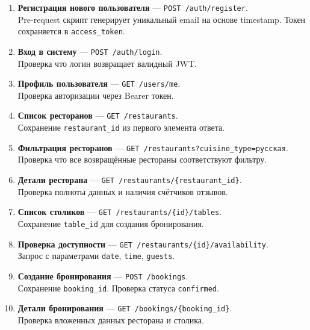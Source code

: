 \documentclass[a4paper,14pt]{extarticle}
\begin{document}
\begin{enumerate}[leftmargin=2cm]
  \item \textbf{Регистрация нового пользователя} — \texttt{POST /auth/register}.\\
    Pre-request скрипт генерирует уникальный email на основе timestamp.
    Токен сохраняется в \texttt{access\_token}.

  \item \textbf{Вход в систему} — \texttt{POST /auth/login}.\\
    Проверка что логин возвращает валидный JWT.

  \item \textbf{Профиль пользователя} — \texttt{GET /users/me}.\\
    Проверка авторизации через Bearer токен.

  \item \textbf{Список ресторанов} — \texttt{GET /restaurants}.\\
    Сохранение \texttt{restaurant\_id} из первого элемента ответа.

  \item \textbf{Фильтрация ресторанов} — \texttt{GET /restaurants?cuisine\_type=русская}.\\
    Проверка что все возвращённые рестораны соответствуют фильтру.

  \item \textbf{Детали ресторана} — \texttt{GET /restaurants/\{restaurant\_id\}}.\\
    Проверка полноты данных и наличия счётчиков отзывов.

  \item \textbf{Список столиков} — \texttt{GET /restaurants/\{id\}/tables}.\\
    Сохранение \texttt{table\_id} для создания бронирования.

  \item \textbf{Проверка доступности} — \texttt{GET /restaurants/\{id\}/availability}.\\
    Запрос с параметрами \texttt{date}, \texttt{time}, \texttt{guests}.

  \item \textbf{Создание бронирования} — \texttt{POST /bookings}.\\
    Сохранение \texttt{booking\_id}. Проверка статуса \texttt{confirmed}.

  \item \textbf{Детали бронирования} — \texttt{GET /bookings/\{booking\_id\}}.\\
    Проверка вложенных данных ресторана и столика.


\end{enumerate}
\end{document}
